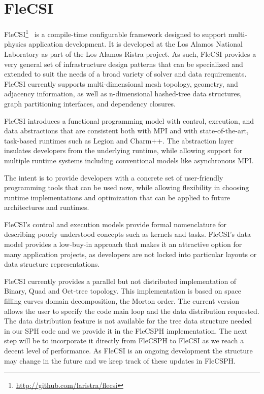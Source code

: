 \section{FleCSI}

FleCSI\footnote{\url{http://github.com/laristra/flecsi}}~\cite{bergen2016flexible} is a compile-time configurable framework designed to support multi-physics application development. 
It is developed at the Los Alamos National Laboratory as part of the Los Alamos Ristra project. 
As such, FleCSI provides a very general set of infrastructure design patterns that can be specialized and extended to suit the needs of a broad variety of solver and data requirements. 
FleCSI currently supports multi-dimensional mesh topology, geometry, and adjacency information, as well as n-dimensional hashed-tree data structures, graph partitioning interfaces, and dependency closures.

FleCSI introduces a functional programming model with control, execution, and data abstractions that are consistent both with MPI and with state-of-the-art, task-based runtimes such as Legion\cite{bauer2012legion} and Charm++\cite{kale1993charm++}. 
The abstraction layer insulates developers from the underlying runtime, while allowing support for multiple runtime systems including conventional models like asynchronous MPI.

The intent is to provide developers with a concrete set of user-friendly programming tools that can be used now, while allowing flexibility in choosing runtime implementations and optimization that can be applied to future architectures and runtimes.

FleCSI's control and execution models provide formal nomenclature for describing poorly understood concepts such as kernels and tasks. 
FleCSI's data model provides a low-buy-in approach that makes it an attractive option for many application projects, as developers are not locked into particular layouts or data structure representations.

FleCSI currently provides a parallel but not distributed implementation of Binary, Quad and Oct-tree topology. 
This implementation is based on space filling curves domain decomposition, the Morton order. 
The current version allows the user to specify the code main loop and the data distribution requested. 
The data distribution feature is not available for the tree data structure needed in our SPH code and we provide it in the FleCSPH implementation. 
The next step will be to incorporate it directly from FleCSPH to FleCSI as we reach a decent level of performance.
As FleCSI is an ongoing development the structure may change in the future and we keep track of these updates in FleCSPH.

